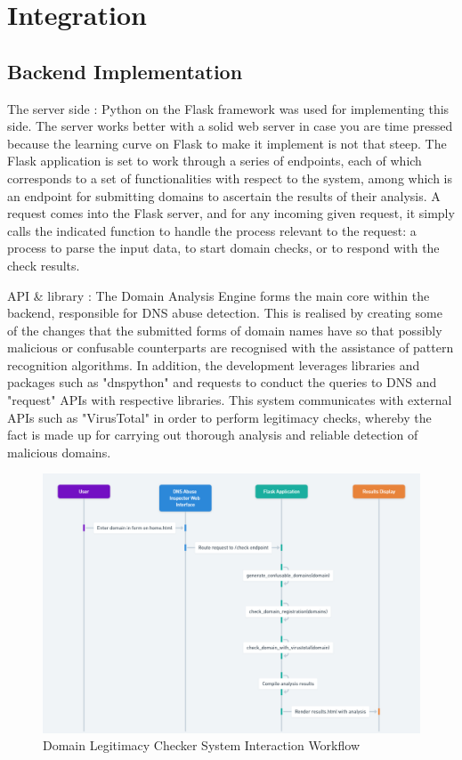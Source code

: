 \section{Integration} 
\subsection{Backend Implementation}

The server side : Python on the Flask framework was used for implementing this side. The server works better with a solid web server in case you are time pressed because the learning curve on Flask to make it implement is not that steep. The Flask application is set to work through a series of endpoints, each of which corresponds to a set of functionalities with respect to the system, among which is an endpoint for submitting domains to ascertain the results of their analysis. A request comes into the Flask server, and for any incoming given request, it simply calls the indicated function to handle the process relevant to the request: a process to parse the input data, to start domain checks, or to respond with the check results.

 API \& library : The Domain Analysis Engine forms the main core within the backend, responsible for DNS abuse detection. This is realised by creating some of the changes that the submitted forms of domain names have so that possibly malicious or confusable counterparts are recognised with the assistance of pattern recognition algorithms. In addition, the development leverages libraries and packages such as "dnspython" and requests to conduct the queries to DNS and "request" APIs with respective libraries. This system communicates with external APIs such as "VirusTotal" in order to perform legitimacy checks, whereby the fact is made up for carrying out thorough analysis and reliable detection of malicious domains.

 \begin{figure}[H]
     \centering
     \includegraphics[width=1\linewidth]{project/Domain Legitimacy Check Workflow.png}
     \caption{Domain Legitimacy Checker System Interaction Workflow}
     \label{fig:figfigfig}
 \end{figure}

